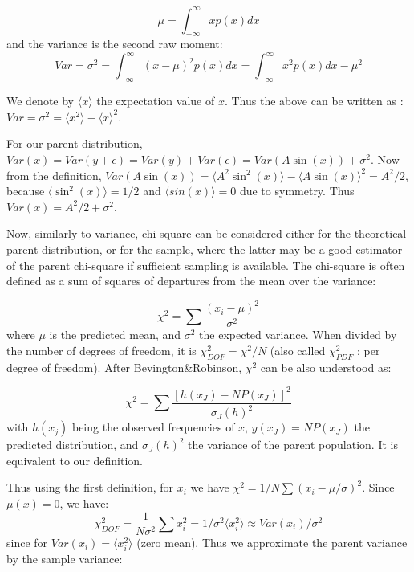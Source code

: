 \documentclass[fleqn,usenatbib]{mnras}  %
\begin{document}
\begin{equation}
\mu = \int_{-\infty}^{\infty}{x p(x) dx}
\end{equation} 
and the variance is the second raw moment:
\begin{equation}
Var = \sigma^{2} =  \int_{-\infty}^{\infty}{(x-\mu)^{2} p(x) dx} =  \int_{-\infty}^{\infty}{x^{2} p(x) dx} - \mu^{2}
\end{equation}

We denote by $\langle x \rangle$ the expectation value of $x$. Thus the above can be written as : $Var= \sigma^{2} = \langle x^{2} \rangle - \langle x \rangle ^{2}$. 

For our parent distribution,  $Var(x) = Var(y+\epsilon) = Var(y) + Var(\epsilon) = Var(A \sin(x)) + \sigma^{2}$. Now from the definition, $Var(A\sin(x)) = \langle A^{2} \sin^{2}(x) \rangle - \langle A \sin(x) \rangle ^{2} = A^{2} / 2 $, because $\langle \sin^{2}(x) \rangle = 1/2$ and $\langle sin(x)\rangle = 0$ due to symmetry. Thus $Var(x) = A^{2}/2  + \sigma^{2}$. 

Now,  similarly to variance, chi-square can be considered either for the theoretical parent distribution, or for the sample, where the latter may be a good estimator of the parent chi-square if sufficient sampling is available. The chi-square is often defined as a sum of squares of departures from the mean over the variance: 

\begin{equation}
\chi^{2} = \sum\frac{(x_{i} - \mu)^{2}}{\sigma^{2}}
\end{equation}
where $\mu$ is the predicted mean, and $\sigma^{2}$ the expected variance. When divided by the number of degrees of freedom, it is  $\chi^{2}_{DOF} = \chi^{2} / N$ (also called $\chi^{2}_{PDF}$ : per degree of freedom). After Bevington$\&$Robinson, $\chi^{2}$ can be also understood as:

\begin{equation}
\chi^{2} = \sum \frac{[h(x_{J}) - N P(x_{J})]^{2}}{\sigma_{J}(h)^{2}}
\end{equation} 
with $h(x_{j})$ being the observed frequencies of $x$,  $y(x_{J}) = N P(x_{J})$ the predicted distribution, and $\sigma_{J}(h)^{2}$ the variance of the parent population. It is equivalent to our definition.

Thus using the first definition, for $x_{i}$ we have  $\chi^{2} = {1/N} \sum(x_{i} - \mu / \sigma)^{2}$. Since  $\mu(x) = 0$, we have:
\begin{equation}
\chi^{2}_{DOF} = \frac{1}{N\sigma^{2}} \sum x_{i}^{2} = 1/\sigma^{2} \langle x_{i}^{2} \rangle \approx  Var(x_{i}) / \sigma^{2}
\end{equation}
since for $Var(x_{i}) =  \langle x_{i}^{2} \rangle $ (zero mean). Thus we approximate the  parent variance by the sample variance: 
\end{document}
